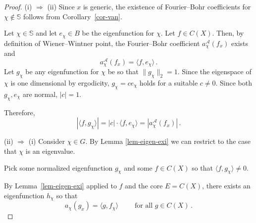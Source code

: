 \documentclass [14pt]{amsart}
\numberwithin{equation}{section}
\newcommand{\CC}{{\mathbb C}}
\newcommand{\cA}{{\mathcal A}}
\newcommand{\dd}{\mbox{\rm d}}
\newcommand{\SSS}{\mathbb S}
\begin{document}
\begin{proof}
\noindent (i) $\Longrightarrow$ (ii) Since $x$ is generic, the existence of Fourier--Bohr coefficients for $\chi \notin \SSS$ follows from Corollary~\ref{cor-van}.


Let $\chi \in \SSS$ and let $e_\chi \in B$ be the eigenfunction for $\chi$. Let $f \in C(X)$. Then, by definition of Wiener--Wintner point, the Fourier--Bohr coefficient $a^\cA_{\chi}(f_x)$ exists and
\[
a^\cA_\chi(f_x)=\langle f, e_\chi\rangle \,.
\]
Let $g_\chi$ be any eigenfunction for $\chi$ be so that $\| g_\chi \|_2=1$. Since the eigenspace of $\chi$ is one dimensional by ergodicity, $g_\chi=c e_\chi$ holds for a suitable $c\neq 0$. Since both $g_\chi, e_\chi$ are normal, $|c|=1$.

Therefore,
\[
|\langle f, g_\chi \rangle|=|c| \cdot \langle f, e_\chi \rangle= |a^\cA_\chi(f_x)| \,.
\]



\smallskip

\noindent (ii) $\Longrightarrow$ (i)
Consider $\chi \in\widehat{G}$.  By Lemma \ref{lem-eigen-exi} we can restrict to the case that $\chi $ is an eigenvalue.

Pick some normalized eigenfunction $g_\chi$ and some $f \in C(X)$ so that $\langle f, g_\chi \rangle \neq 0$.

By Lemma~\ref{lem-eigen-exi} applied to $f$ and the core $E=C(X)$, there exists an eigenfunction $h_\chi$ so that
\[
a_\chi(g_x)= \langle g, f_\chi \rangle \qquad \mbox{ for all } g \in C(X) \,.
\]



\end{proof}
\end{document}
